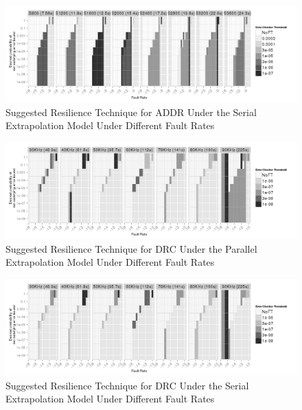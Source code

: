 \documentclass[10pt, conference, compsocconf]{IEEEtran}
\begin{document}
\begin{figure}[ht!]
\centering
\includegraphics[width=7in]{figs/Lasso_Serial_SuggestedConf.png}
\vspace{-10pt}
\caption{Suggested Resilience Technique for ADDR Under the Serial Extrapolation Model Under Different Fault Rates}
\vspace{-10pt}
\label{fig:Lasso_Serial_SuggestedConf}
\end{figure}

\begin{figure}[ht!]
\centering
\includegraphics[width=7in]{figs/DRC_Parallel_SuggestedConf.png}
\vspace{-10pt}
\caption{Suggested Resilience Technique for DRC Under the Parallel Extrapolation Model Under Different Fault Rates}
\vspace{-10pt}
\label{fig:DRC_Parallel_SuggestedConf}
\end{figure}

\begin{figure}[ht!]
\centering
\includegraphics[width=7in]{figs/DRC_Serial_SuggestedConf.png}
\vspace{-10pt}
\caption{Suggested Resilience Technique for DRC Under the Serial Extrapolation Model Under Different Fault Rates}
\vspace{-10pt}
\label{fig:DRC_Serial_SuggestedConf}
\end{figure}
\end{document}
